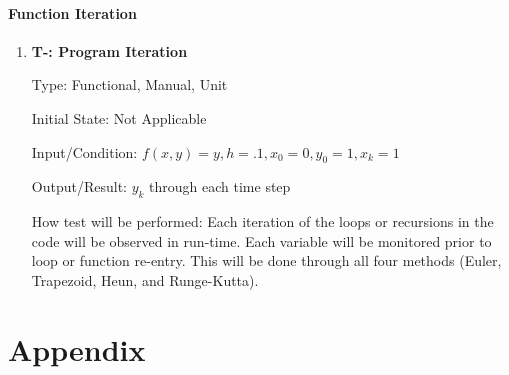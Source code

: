 \documentclass[12pt, titlepage]{article}
\newcounter{tnum} %
\begin{document}


\paragraph{Function Iteration}

\begin{enumerate}

\item{\textbf{T-\thetnum \label{t-difference}: Program Iteration}}

Type: Functional, Manual, Unit 
					
Initial State: Not Applicable
					
Input/Condition: $f(x, y) = y, h = .1, x_0 = 0, y_0 = 1, x_k = 1$
					
Output/Result: $y_k$ through each time step

How test will be performed: Each iteration of the loops or recursions in the code will be observed in run-time.
Each variable will be monitored prior to loop or function re-entry. This will be done through all four methods (Euler, 
Trapezoid, Heun, and Runge-Kutta).

\end{enumerate}





\newpage

\section{Appendix}
\end{document}
